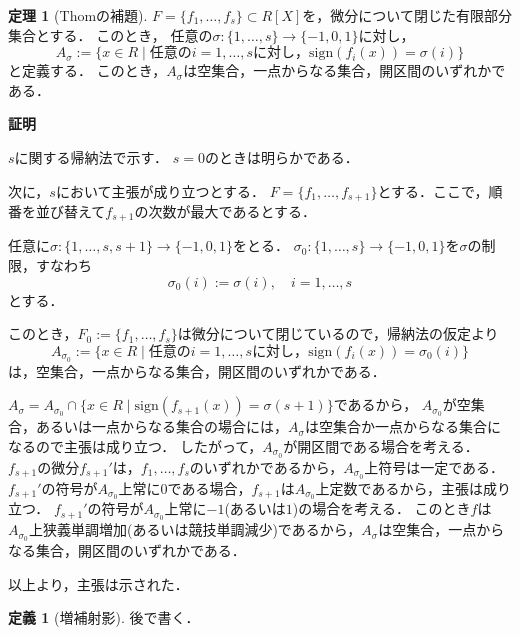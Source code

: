 \documentclass[uplatex, dvipdfmx]{jsarticle}
\makeatletter
\renewenvironment{proof}[1][\proofname]{\par
  \pushQED{\qed}%
  \normalfont \topsep6\p@\@plus6\p@\relax
  \trivlist
  \item\relax
  {\bfseries
  #1\@addpunct{.}}\hspace\labelsep\ignorespaces
}{%
  \popQED\endtrivlist\@endpefalse
}
\newcommand{\sign}{\mathrm{sign}}
\newcommand{\map}[3]{{#1}:{#2}\rightarrow{#3}}
\theoremstyle{definition}
\newtheorem{definition}{定義}[section]
\newtheorem{theorem}{定理}[section]
\renewcommand{\proofname}{\textbf{証明}}
\makeatother
\begin{document}
\begin{theorem}[Thomの補題]
     $F = \{f_1, \dots, f_s\} \subset R[X]$を，微分について閉じた有限部分集合とする．
     このとき， 任意の$\map{\sigma}{\{1, \dots, s\}}{\{-1,0,1\}}$に対し，
     \[
          A_\sigma := \{x \in R \mid \text{任意の$i=1, \dots, s$に対し，} \sign(f_i(x)) = \sigma(i)\}
     \]
     と定義する．
     このとき，$A_\sigma$は空集合，一点からなる集合，開区間のいずれかである．
\end{theorem}

\begin{proof}
     $s$に関する帰納法で示す．
     $s = 0$のときは明らかである．
     
     次に，$s$において主張が成り立つとする．
     $F = \{f_1, \dots, f_{s+1}\}$とする．ここで，順番を並び替えて$f_{s+1}$の次数が最大であるとする．

     任意に$\map{\sigma}{\{1, \dots, s, s+1\}}{\{-1,0,1\}}$をとる．
     $\map{\sigma_0}{\{1, \dots, s\}}{\{-1,0,1\}}$を$\sigma$の制限，すなわち
     \[
          \sigma_0(i) := \sigma(i), \quad i=1, \dots, s
     \]
     とする．

     このとき，$F_0 := \{f_1, \dots, f_{s}\}$は微分について閉じているので，帰納法の仮定より
     \[
          A_{\sigma_0}:=\{x \in R \mid \text{任意の$i=1, \dots, s$に対し，} \sign(f_i(x)) = \sigma_0(i)\}
     \]
     は，空集合，一点からなる集合，開区間のいずれかである．

     $A_\sigma = A_{\sigma_0} \cap \{x \in R \mid \sign(f_{s+1}(x)) = \sigma(s+1)\}$であるから，
     $A_{\sigma_0}$が空集合，あるいは一点からなる集合の場合には，$A_\sigma$は空集合か一点からなる集合になるので主張は成り立つ．
     したがって，$A_{\sigma_0}$が開区間である場合を考える．
     $f_{s+1}$の微分$f_{s+1}'$は，$f_1, \dots, f_s$のいずれかであるから，$A_{\sigma_0}$上符号は一定である．
     $f_{s+1}'$の符号が$A_{\sigma_0}$上常に$0$である場合，$f_{s+1}$は$A_{\sigma_0}$上定数であるから，主張は成り立つ．
     $f_{s+1}'$の符号が$A_{\sigma_0}$上常に$-1$(あるいは$1$)の場合を考える．
     このとき$f$は$A_{\sigma_0}$上狭義単調増加(あるいは競技単調減少)であるから，$A_{\sigma}$は空集合，一点からなる集合，開区間のいずれかである．

     以上より，主張は示された．
\end{proof}

\begin{definition}[増補射影]
     後で書く．

\end{definition}
\end{document}
